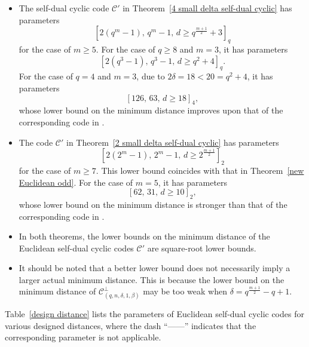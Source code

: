\documentclass[10pt,a4paper]{amsart}
\begin{document}
\begin{itemize}
    \item The self-dual cyclic code $\mathcal{C}'$ in Theorem~\ref{4 small delta self-dual cyclic} has parameters
    \[
    [2(q^m-1),\, q^m-1,\, d \ge q^{\frac{m+1}{2}} + 3]_q
    \]
    for the case of $m \ge 5$. For the case of $q \ge 8$ and $m = 3$, it has parameters
    \[
    [2(q^3-1),\, q^3-1,\, d \ge q^2 + 4]_q.
    \]
    For the case of $q = 4$ and $m = 3$, due to $2\delta = 18 < 20 = q^2 + 4$, it has parameters
    \[
    [126,\, 63,\, d \ge 18]_4,
    \]
    whose lower bound on the minimum distance improves upon that of the corresponding code in \cite{10856234}.

    \item The code $\mathcal{C}'$ in Theorem~\ref{2 small delta self-dual cyclic} has parameters
    \[
    [2(2^m-1),\, 2^m-1,\, d \ge 2^{\frac{m+1}{2}}]_2
    \]
    for the case of $m \ge 7$. This lower bound coincides with that in Theorem~\ref{new Euclidean odd}. For the case of $m = 5$, it has parameters
    \[
    [62,\, 31,\, d \ge 10]_2,
    \]
    whose lower bound on the minimum distance is stronger than that of the corresponding code in \cite{10856234}.

    \item In both theorems, the lower bounds on the minimum distance of the Euclidean self-dual cyclic codes $\mathcal{C}'$ are square-root lower bounds.

    \item It should be noted that a better lower bound does not necessarily imply a larger actual minimum distance. This is because the lower bound on the minimum distance of $\mathcal{C}_{(q,n,\delta,1,\beta)}^\perp$ may be too weak when $\delta = q^{\frac{m+1}{2}} - q + 1$.
\end{itemize}

Table~\ref{design distance} lists the parameters of Euclidean self-dual cyclic codes for various designed distances, where the dash ``——'' indicates that the corresponding parameter is not applicable.
\end{document}
